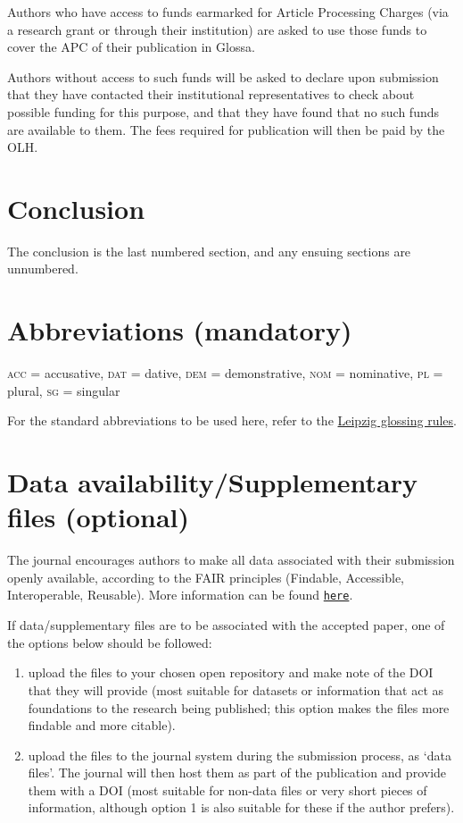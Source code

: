 \documentclass[charis,linguex,biblatex]{glossa}
\begin{document}
Authors who have access to funds earmarked for Article Processing Charges (via a research grant or through their institution) are asked to use those funds to cover the APC of their publication in Glossa. 

Authors without access to such funds will be asked to declare upon submission that they have contacted their institutional representatives to check about possible funding for this purpose, and that they have found that no such funds are available to them. The fees required for publication will then be paid by the OLH. %

\section{Conclusion}

The conclusion is the last numbered section, and any ensuing sections are unnumbered.

\section*{Abbreviations (mandatory)}\label{abbrev}

\textsc{acc} = accusative, \textsc{dat} = dative, \textsc{dem} = demonstrative, \textsc{nom} = nominative, \textsc{pl} = plural, \textsc{sg} = singular

For the standard abbreviations to be used here, refer to the \href{https://www.eva.mpg.de/lingua/resources/glossing-rules.php}{Leipzig glossing rules}. 

\section*{Data availability/Supplementary files (optional)}

The journal encourages authors to make all data associated with their submission openly available, according to the FAIR principles (Findable, Accessible, Interoperable, Reusable). More information can be found \href{https://www.glossa-journal.org/about/editorialpolicies/#data-policy}{\texttt{here}}.

If data/supplementary files are to be associated with the accepted paper, one of the options below should be followed:
\begin{enumerate}
\item upload the files to your chosen open repository and make note of the DOI that they will provide (most suitable for datasets or information that act as foundations to the research being published; this option makes the files more findable and more citable).
\item upload the files to the journal system during the submission process, as `data files'. The journal will then host them as part of the publication and provide them with a DOI (most suitable for non-data files or very short pieces of information, although option 1 is also suitable for these if the author prefers).
\end{enumerate}
\end{document}

